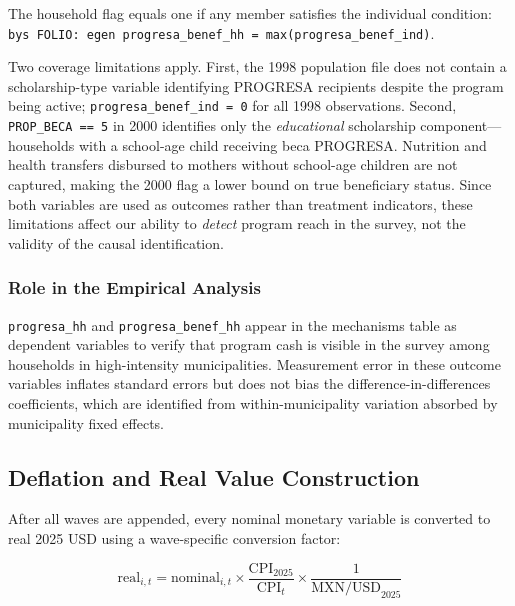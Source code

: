 \noindent
The household flag equals one if any member satisfies the individual condition:
\texttt{bys FOLIO: egen progresa\_benef\_hh = max(progresa\_benef\_ind)}.

Two coverage limitations apply. First, the 1998 population file does not
contain a scholarship-type variable identifying PROGRESA recipients despite the
program being active; \texttt{progresa\_benef\_ind = 0} for all 1998
observations. Second, \texttt{PROP\_BECA == 5} in 2000 identifies only the
\textit{educational} scholarship component---households with a school-age child
receiving beca PROGRESA. Nutrition and health transfers disbursed to mothers
without school-age children are not captured, making the 2000 flag a lower
bound on true beneficiary status. Since both variables are used as outcomes
rather than treatment indicators, these limitations affect our ability to
\textit{detect} program reach in the survey, not the validity of the
causal identification.

\subsubsection{Role in the Empirical Analysis}

\texttt{progresa\_hh} and \texttt{progresa\_benef\_hh} appear in the mechanisms
table as dependent variables to verify that program cash is visible in the
survey among households in high-intensity municipalities. Measurement error
in these outcome variables inflates standard errors but does not bias the
difference-in-differences coefficients, which are identified from
within-municipality variation absorbed by municipality fixed effects.

\subsection{Deflation and Real Value Construction}
\label{app:enigh_deflation}

After all waves are appended, every nominal monetary variable is converted to
real 2025 USD using a wave-specific conversion factor:

\begin{equation}
\text{real}_{i,t} = \text{nominal}_{i,t} \times
  \frac{\text{CPI}_{2025}}{\text{CPI}_{t}} \times
  \frac{1}{\text{MXN/USD}_{2025}}
\end{equation}

